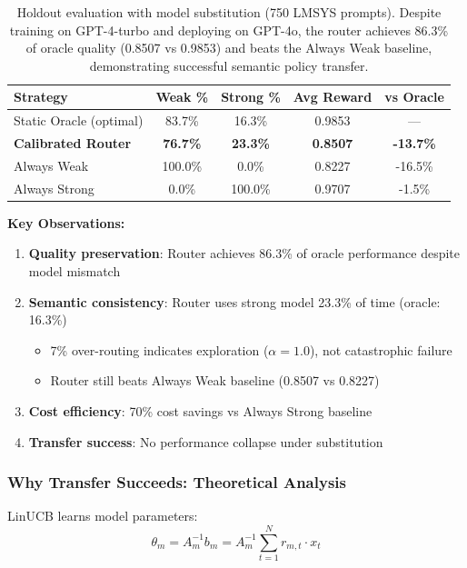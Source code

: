 \begin{table}[h]
\centering
\small
\begin{tabular}{@{}lcccc@{}}
\toprule
\textbf{Strategy} & \textbf{Weak \%} & \textbf{Strong \%} & \textbf{Avg Reward} & \textbf{vs Oracle} \\ \midrule
Static Oracle (optimal) & 83.7\% & 16.3\% & 0.9853 & — \\
\midrule
\textbf{Calibrated Router} & \textbf{76.7\%} & \textbf{23.3\%} & \textbf{0.8507} & \textbf{-13.7\%} \\
Always Weak & 100.0\% & 0.0\% & 0.8227 & -16.5\% \\
Always Strong & 0.0\% & 100.0\% & 0.9707 & -1.5\% \\
\bottomrule
\end{tabular}
\caption{Holdout evaluation with model substitution (750 LMSYS prompts). Despite training on GPT-4-turbo and deploying on GPT-4o, the router achieves 86.3\% of oracle quality (0.8507 vs 0.9853) and beats the Always Weak baseline, demonstrating successful semantic policy transfer.}
\label{tab:model_transfer_results}
\end{table}

\textbf{Key Observations:}
\begin{enumerate}
    \item \textbf{Quality preservation}: Router achieves 86.3\% of oracle performance despite model mismatch
    \item \textbf{Semantic consistency}: Router uses strong model 23.3\% of time (oracle: 16.3\%)
    \begin{itemize}
        \item 7\% over-routing indicates exploration ($\alpha=1.0$), not catastrophic failure
        \item Router still beats Always Weak baseline (0.8507 vs 0.8227)
    \end{itemize}
    \item \textbf{Cost efficiency}: 70\% cost savings vs Always Strong baseline
    \item \textbf{Transfer success}: No performance collapse under substitution
\end{enumerate}

\subsubsection{Why Transfer Succeeds: Theoretical Analysis}

LinUCB learns model parameters:
\begin{equation}
    \theta_m = A_m^{-1} b_m = A_m^{-1} \sum_{t=1}^{N} r_{m,t} \cdot x_t
\end{equation}

